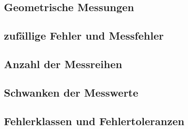 \subsection{Geometrische Messungen}

\subsection{zufällige Fehler und Messfehler}

\subsection{Anzahl der Messreihen}

\subsection{Schwanken der Messwerte}

\subsection{Fehlerklassen und Fehlertoleranzen}
